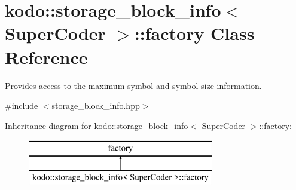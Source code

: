 \hypertarget{classkodo_1_1storage__block__info_1_1factory}{\section{kodo\-:\-:storage\-\_\-block\-\_\-info$<$ Super\-Coder $>$\-:\-:factory Class Reference}
\label{classkodo_1_1storage__block__info_1_1factory}
}


Provides access to the maximum symbol and symbol size information.  




{\ttfamily \#include $<$storage\-\_\-block\-\_\-info.\-hpp$>$}

Inheritance diagram for kodo\-:\-:storage\-\_\-block\-\_\-info$<$ Super\-Coder $>$\-:\-:factory\-:\begin{figure}[H]
\begin{center}
\leavevmode
\includegraphics[height=2.000000cm]{classkodo_1_1storage__block__info_1_1factory}
\end{center}
\end{figure}
